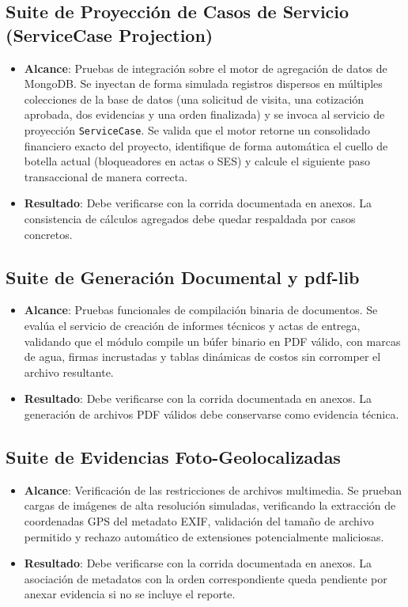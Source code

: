 \subsection{Suite de Proyección de Casos de Servicio (ServiceCase Projection)}
\begin{itemize}
    \item \textbf{Alcance}: Pruebas de integración sobre el motor de agregación de datos de MongoDB. Se inyectan de forma simulada registros dispersos en múltiples colecciones de la base de datos (una solicitud de visita, una cotización aprobada, dos evidencias y una orden finalizada) y se invoca al servicio de proyección \texttt{ServiceCase}. Se valida que el motor retorne un consolidado financiero exacto del proyecto, identifique de forma automática el cuello de botella actual (bloqueadores en actas o SES) y calcule el siguiente paso transaccional de manera correcta.
    \item \textbf{Resultado}: Debe verificarse con la corrida documentada en anexos. La consistencia de cálculos agregados debe quedar respaldada por casos concretos.
\end{itemize}

\subsection{Suite de Generación Documental y pdf-lib}
\begin{itemize}
    \item \textbf{Alcance}: Pruebas funcionales de compilación binaria de documentos. Se evalúa el servicio de creación de informes técnicos y actas de entrega, validando que el módulo compile un búfer binario en PDF válido, con marcas de agua, firmas incrustadas y tablas dinámicas de costos sin corromper el archivo resultante.
    \item \textbf{Resultado}: Debe verificarse con la corrida documentada en anexos. La generación de archivos PDF válidos debe conservarse como evidencia técnica.
\end{itemize}

\subsection{Suite de Evidencias Foto-Geolocalizadas}
\begin{itemize}
    \item \textbf{Alcance}: Verificación de las restricciones de archivos multimedia. Se prueban cargas de imágenes de alta resolución simuladas, verificando la extracción de coordenadas GPS del metadato EXIF, validación del tamaño de archivo permitido y rechazo automático de extensiones potencialmente maliciosas.
    \item \textbf{Resultado}: Debe verificarse con la corrida documentada en anexos. La asociación de metadatos con la orden correspondiente queda pendiente por anexar evidencia si no se incluye el reporte.
\end{itemize}

